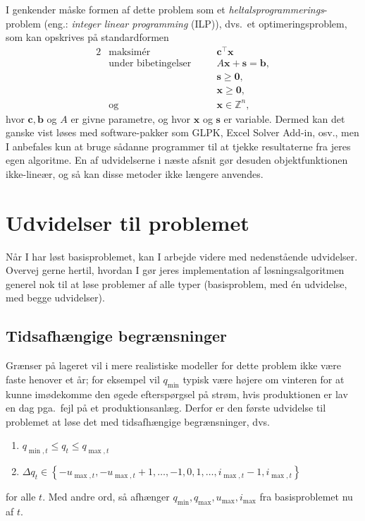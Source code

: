 \documentclass[12pt,oneside,final]{article}
\newcommand{\Z}{\mathbb{Z}}
\newcommand{\1}{\mathbbm{1}}
\newcommand{\vzero}{\bm{0}}
\newcommand{\vx}{\bm{x}}
\newcommand{\vb}{\bm{b}}
\newcommand{\vc}{\bm{c}}
\newcommand{\vs}{\bm{s}}
\begin{document}
I genkender måske formen af dette problem som et \emph{heltalsprogrammerings}-problem (eng.: \emph{integer linear programming} (ILP)), dvs.\ et optimeringsproblem, som kan opskrives på standardformen
\begin{alignat*}{2}
 & \text{maksimér}            &\quad  & \vc^{\top} \vx  \\
 & \text{under bibetingelser} &\quad  & A \vx + \vs = \vb , \\
 &                            &\quad  & \vs \geq \vzero , \\
 &                            &\quad  & \vx \geq \vzero , \\
 & \text{og}                  &\quad  & \vx \in \Z^{n} ,
\end{alignat*}
hvor \(\vc,\vb\) og \(A\) er givne parametre, og hvor \(\vx\) og \(\vs\) er variable.
Dermed kan det ganske vist løses med software-pakker som GLPK, Excel Solver Add-in, osv., men I anbefales kun at bruge sådanne programmer til at tjekke resultaterne fra jeres egen algoritme.
En af udvidelserne i næste afsnit gør desuden objektfunktionen ikke-lineær, og så kan disse metoder ikke længere anvendes.


\clearpage
\section{Udvidelser til problemet}
Når I har løst basisproblemet, kan I arbejde videre med nedenstående udvidelser.
Overvej gerne hertil, hvordan I gør jeres implementation af løsningsalgoritmen generel nok til at løse problemer af alle typer (basisproblem, med én udvidelse, med begge udvidelser).

\subsection{Tidsafhængige begrænsninger}
Grænser på lageret vil i mere realistiske modeller for dette problem ikke være faste henover et år;
for eksempel vil \(q_{\min}\) typisk være højere om vinteren for at kunne imødekomme den øgede efterspørgsel på strøm, hvis produktionen er lav en dag pga.\ fejl på et produktionsanlæg.
Derfor er den første udvidelse til problemet at løse det med tidsafhængige begrænsninger, dvs.\
\begin{enumerate}
\item \(q_{\min,t} \leq q_{t} \leq q_{\max,t}\)
\item \(\Delta q_{t} \in
    \left\{
    -u_{\max,t} , -u_{\max,t}+1 , \dotsc, -1, 0, 1, \dotsc, i_{\max,t} - 1 , i_{\max,t}
    \right\}\)
\end{enumerate}
for alle \(t\).
Med andre ord, så afhænger \(q_{\min}, q_{\max}, u_{\max}, i_{\max}\) fra basisproblemet nu af \(t\).
\end{document}
